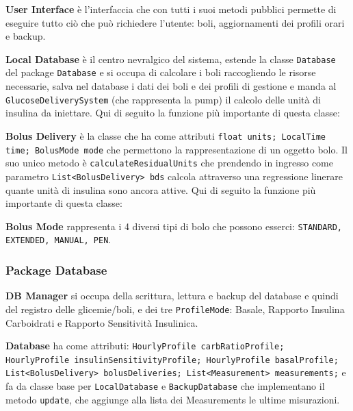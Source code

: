 \documentclass[twocolumn]{article}
\begin{document}
\textbf{User Interface}
\newline è l'interfaccia che con tutti i suoi metodi pubblici permette di eseguire tutto ciò che può richiedere l'utente: boli, aggiornamenti dei profili orari e backup.    


\textbf{Local Database}
\newline è il centro nevralgico del sistema, estende la classe \texttt{Database} del package \texttt{Database} e si occupa di calcolare i boli raccogliendo le risorse necessarie, salva nel database i dati dei boli e dei profili di gestione e manda al \texttt{GlucoseDeliverySystem} (che rappresenta la pump) il calcolo delle unità di insulina da iniettare. Qui di seguito la funzione più importante di questa classe:



\textbf{Bolus Delivery}
\newline è la classe che ha come attributi \texttt{float units; LocalTime time; BolusMode mode} che permettono la rappresentazione di un oggetto bolo. Il suo unico metodo è \texttt{calculateResidualUnits} che prendendo in ingresso come parametro \texttt{List<BolusDelivery> bds} calcola attraverso una regressione linerare quante unità di insulina sono ancora attive. Qui di seguito la funzione più importante di questa classe:




\textbf{Bolus Mode}
\newline rappresenta i 4 diversi tipi di bolo che possono esserci: \texttt{STANDARD, EXTENDED, MANUAL, PEN}.


\subsubsection{Package Database}

\textbf{DB Manager}
\newline si occupa della scrittura, lettura e backup del database e quindi del registro delle glicemie/boli, e dei tre \texttt{ProfileMode}: Basale, Rapporto Insulina Carboidrati e Rapporto Sensitività Insulinica.

\textbf{Database}
\newline ha come attributi: \texttt{HourlyProfile carbRatioProfile; HourlyProfile insulinSensitivityProfile; HourlyProfile basalProfile; List<BolusDelivery> bolusDeliveries; List<Measurement> measurements;} e fa da classe base per \texttt{LocalDatabase} e \texttt{BackupDatabase} che implementano il metodo \texttt{update}, che aggiunge alla lista dei Measurements le ultime misurazioni.
\end{document}
